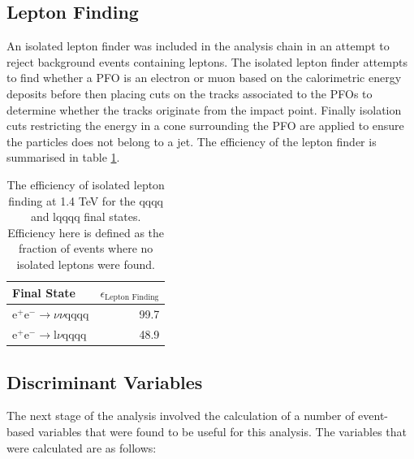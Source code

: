 
\subsection{Lepton Finding} 
\label{sec:isolatedleptonfinding}
An isolated lepton finder was included in the analysis chain in an attempt to reject background events containing leptons.  The isolated lepton finder attempts to find whether a PFO is an electron or muon based on the calorimetric energy deposits before then placing cuts on the tracks associated to the PFOs to determine whether the tracks originate from the impact point.  Finally isolation cuts restricting the energy in a cone surrounding the PFO are applied to ensure the particles does not belong to a jet.  The efficiency of the lepton finder is summarised in table \ref{table:efficiencyleptonfinding}.  

\begin{table}[h!]
\centering
\begin{tabular}{ l r }
\hline
Final State & $\epsilon_{\text{Lepton Finding}}$ \\ 
\hline
$\text{e}^{+}\text{e}^{-} \rightarrow \nu{\nu}\text{qqqq}$ & 99.7 \\
$\text{e}^{+}\text{e}^{-} \rightarrow \text{l}\nu\text{qqqq}$ & 48.9 \\
\hline
\end{tabular}
\caption[The efficiency of isolated lepton finding at 1.4 TeV for the {\nu}{\nu}qqqq and l{\nu}qqqq final states.]{The efficiency of isolated lepton finding at 1.4 TeV for the {\nu}{\nu}qqqq and l{\nu}qqqq final states.  Efficiency here is defined as the fraction of events where no isolated leptons were found.}
\label{table:efficiencyleptonfinding}
\end{table}


\subsection{Discriminant Variables} 
\label{sec:analysisprocessor}
The next stage of the analysis involved the calculation of a number of event-based variables that were found to be useful for this analysis.  The variables that were calculated are as follows:

